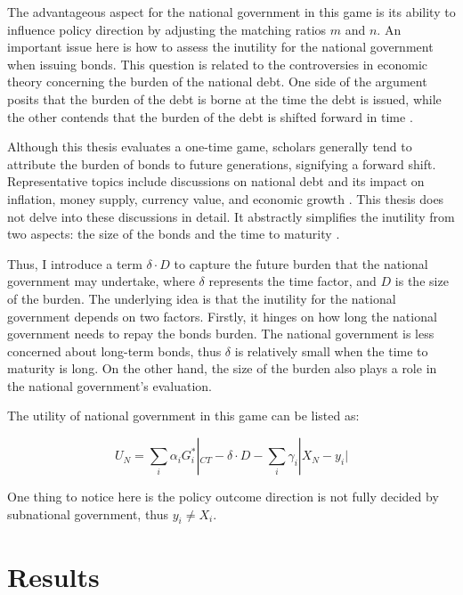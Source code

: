 The advantageous aspect for the national government in this game is its ability to influence policy direction by adjusting the matching ratios $m$ and $n$. An important issue here is how to assess the inutility for the national government when issuing bonds. This question is related to the controversies in economic theory concerning the burden of the national debt. One side of the argument posits that the burden of the debt is borne at the time the debt is issued, while the other contends that the burden of the debt is shifted forward in time \parencite{modigliani1961long, holcombe1981national}.

Although this thesis evaluates a one-time game, scholars generally tend to attribute the burden of bonds to future generations, signifying a forward shift. Representative topics include discussions on national debt and its impact on inflation, money supply, currency value, and economic growth \parencite{cochrane2011inflation, aizenman2011using, hamburger1981deficits, panizza2014public, lucas1983optimal}. This thesis does not delve into these discussions in detail. It abstractly simplifies the inutility from two aspects: the size of the bonds and the time to maturity \parencite{diamond1965national, modigliani1961long, fullwiler2020interest}.%

Thus, I introduce a term $\delta \cdot D$ to capture the future burden that the national government may undertake, where $\delta$ represents the time factor, and $D$ is the size of the burden. The underlying idea is that the inutility for the national government depends on two factors. Firstly, it hinges on how long the national government needs to repay the bonds burden. The national government is less concerned about long-term bonds, thus $\delta$ is relatively small when the time to maturity is long. On the other hand, the size of the burden also plays a role in the national government's evaluation.%

The utility of national government in this game can be listed as:

\begin{equation}
    U_N=\sum_i \alpha_iG_i^*|_{CT}-\delta \cdot D-\sum_i \gamma_i |X_N-y_i|
\end{equation}

One thing to notice here is the policy outcome direction is not fully decided by subnational government, thus $y_i\neq X_i$.


\section{Results}


